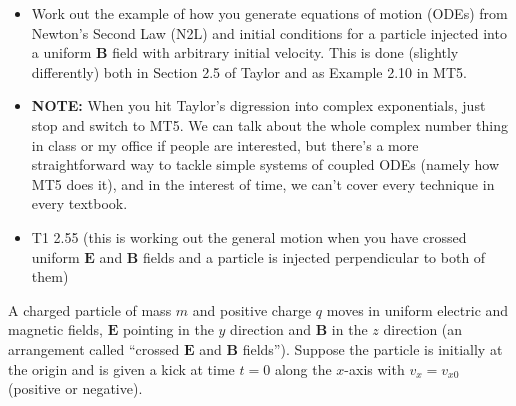 \documentclass[12pt]{article}
\begin{document}
\begin{itemize}
    \item Work out the example of how you generate equations of motion (ODEs) from Newton's Second Law (N2L) and initial conditions for a particle injected into a uniform \(\mathbf{B}\) field with arbitrary initial velocity. This is done (slightly differently) both in Section 2.5 of Taylor and as Example 2.10 in MT5.
    
    \item \textbf{NOTE:} When you hit Taylor’s digression into complex exponentials, just stop and switch to MT5. We can talk about the whole complex number thing in class or my office if people are interested, but there’s a more straightforward way to tackle simple systems of coupled ODEs (namely how MT5 does it), and in the interest of time, we can’t cover every technique in every textbook.
    
    \item T1 2.55 (this is working out the general motion when you have crossed uniform \(\mathbf{E}\) and \(\mathbf{B}\) fields and a particle is injected perpendicular to both of them)
\end{itemize}
A charged particle of mass \( m \) and positive charge \( q \) moves in uniform electric and magnetic fields, \( \mathbf{E} \) pointing in the \( y \) direction and \( \mathbf{B} \) in the \( z \) direction (an arrangement called “crossed \(\mathbf{E}\) and \(\mathbf{B}\) fields”). Suppose the particle is initially at the origin and is given a kick at time \( t = 0 \) along the \( x \)-axis with \( v_x = v_{x0} \) (positive or negative). 
\end{document}
